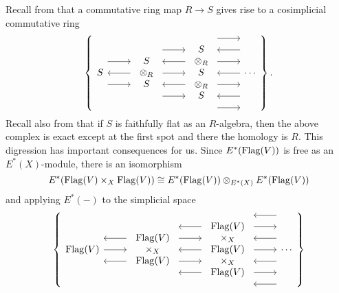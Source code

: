 Recall from  that a commutative ring map \(R \rightarrow S\) gives rise to a cosimplicial commutative ring
\[\left\{
\begin{tikzcd}[ampersand replacement=\&]
S \arrow[leftarrow]{r} \arrow[shift left=\baselineskip]{r} \arrow[shift right=\baselineskip]{r} \&
\begin{array}{c} S \\ \otimes_R \\ S \end{array} \arrow[shift left=(2*\baselineskip)]{r} \arrow[leftarrow, shift left=\baselineskip]{r} \arrow{r} \arrow[leftarrow, shift right=\baselineskip]{r} \arrow[shift right=(2*\baselineskip)]{r} \&
\begin{array}{c} S \\ \otimes_R \\ S \\ \otimes_R \\ S \end{array} \arrow[shift left=(3*\baselineskip)]{r} \arrow[leftarrow, shift left=(2*\baselineskip)]{r} \arrow[shift left=\baselineskip]{r} \arrow[leftarrow]{r} \arrow[shift right=\baselineskip]{r} \arrow[leftarrow, shift right=(2*\baselineskip)]{r} \arrow[shift right=(3*\baselineskip)]{r} \&
\cdots
\end{tikzcd}
\right\}.\]
Recall also from  that if \(S\) is faithfully flat as an \(R\)-algebra, then the above complex is exact except at the first spot and there the homology is \(R\).  This digression has important consequences for us. Since \(E^*(\operatorname{Flag}(V))\) is free as an \(E^*(X)\)-module, there is an isomorphism
\[
E^*(\operatorname{Flag}(V) \times_X \operatorname{Flag}(V)) \cong E^*(\operatorname{Flag}(V)) \otimes_{E^*(X)} E^*(\operatorname{Flag}(V))
\]
and applying \(E^*(-)\) to the simplicial space
\[\left\{
\begin{tikzcd}[ampersand replacement=\&]
\Flag(V) \arrow{r} \arrow[leftarrow,shift left=\baselineskip]{r} \arrow[leftarrow,shift right=\baselineskip]{r} \&
\begin{array}{c} \Flag(V) \\ \times_X \\ \Flag(V) \end{array} \arrow[leftarrow, shift left=(2*\baselineskip)]{r} \arrow[shift left=\baselineskip]{r} \arrow[leftarrow]{r} \arrow[shift right=\baselineskip]{r} \arrow[leftarrow, shift right=(2*\baselineskip)]{r} \&
\begin{array}{c} \Flag(V) \\ \times_X \\ \Flag(V) \\ \times_X \\ \Flag(V) \end{array} \arrow[leftarrow, shift left=(3*\baselineskip)]{r} \arrow[shift left=(2*\baselineskip)]{r} \arrow[leftarrow, shift left=\baselineskip]{r} \arrow{r} \arrow[leftarrow, shift right=\baselineskip]{r} \arrow[shift right=(2*\baselineskip)]{r} \arrow[leftarrow, shift right=(3*\baselineskip)]{r} \&
\cdots
\end{tikzcd}
\right\}\]

